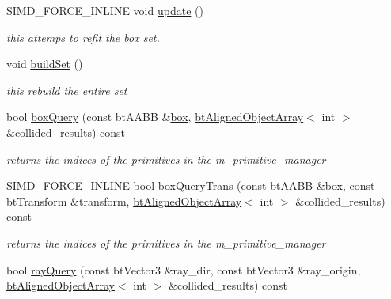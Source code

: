 \begin{DoxyCompactItemize}
\item 
S\+I\+M\+D\+\_\+\+F\+O\+R\+C\+E\+\_\+\+I\+N\+L\+I\+N\+E void \hyperlink{classbt_g_impact_bvh_ac0511b84c8722348fe4295b2a8f40c81}{update} ()
\begin{DoxyCompactList}\small\item\em this attemps to refit the box set. \end{DoxyCompactList}\item 
\hypertarget{classbt_g_impact_bvh_a09c889dd33db157383fb5bdb17d58d51}{void \hyperlink{classbt_g_impact_bvh_a09c889dd33db157383fb5bdb17d58d51}{build\+Set} ()}\label{classbt_g_impact_bvh_a09c889dd33db157383fb5bdb17d58d51}

\begin{DoxyCompactList}\small\item\em this rebuild the entire set \end{DoxyCompactList}\item 
\hypertarget{classbt_g_impact_bvh_a783a6189f8237a27a7f9255379eda48f}{bool \hyperlink{classbt_g_impact_bvh_a783a6189f8237a27a7f9255379eda48f}{box\+Query} (const bt\+A\+A\+B\+B \&\hyperlink{structbox}{box}, \hyperlink{classbt_aligned_object_array}{bt\+Aligned\+Object\+Array}$<$ int $>$ \&collided\+\_\+results) const }\label{classbt_g_impact_bvh_a783a6189f8237a27a7f9255379eda48f}

\begin{DoxyCompactList}\small\item\em returns the indices of the primitives in the m\+\_\+primitive\+\_\+manager \end{DoxyCompactList}\item 
\hypertarget{classbt_g_impact_bvh_a78ffbcc96d7bcb3998bac7eff4f816b4}{S\+I\+M\+D\+\_\+\+F\+O\+R\+C\+E\+\_\+\+I\+N\+L\+I\+N\+E bool \hyperlink{classbt_g_impact_bvh_a78ffbcc96d7bcb3998bac7eff4f816b4}{box\+Query\+Trans} (const bt\+A\+A\+B\+B \&\hyperlink{structbox}{box}, const bt\+Transform \&transform, \hyperlink{classbt_aligned_object_array}{bt\+Aligned\+Object\+Array}$<$ int $>$ \&collided\+\_\+results) const }\label{classbt_g_impact_bvh_a78ffbcc96d7bcb3998bac7eff4f816b4}

\begin{DoxyCompactList}\small\item\em returns the indices of the primitives in the m\+\_\+primitive\+\_\+manager \end{DoxyCompactList}\item 
\hypertarget{classbt_g_impact_bvh_a370a3ad672c83a0fee3afe16c4428b16}{bool \hyperlink{classbt_g_impact_bvh_a370a3ad672c83a0fee3afe16c4428b16}{ray\+Query} (const bt\+Vector3 \&ray\+\_\+dir, const bt\+Vector3 \&ray\+\_\+origin, \hyperlink{classbt_aligned_object_array}{bt\+Aligned\+Object\+Array}$<$ int $>$ \&collided\+\_\+results) const }\label{classbt_g_impact_bvh_a370a3ad672c83a0fee3afe16c4428b16}


\end{DoxyCompactItemize}
